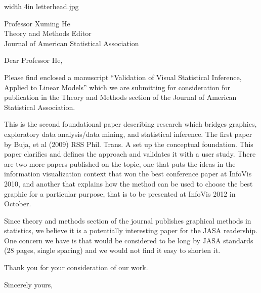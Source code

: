 \documentclass{letter}
\makeatletter
\def\apl#1#2{
\begin{letter}{#1}
\signature{Mahbubul Majumder, Heike Hofmann and Dianne Cook\\Department of Statistics\\Iowa State University 
\\Ames, Iowa 50011-1210\\ Phone (515) 294 3440\\{\tt mahbub@iastate.edu}}
\opening{{Dear #2,}}

Please find enclosed a manuscript  ``Validation of Visual
Statistical Inference, Applied to Linear Models'' which we are
submitting for consideration for publication in the
Theory and Methods section of the Journal of American Statistical
Association.

This is the second foundational paper describing research which bridges
graphics, exploratory data analysis/data mining, and statistical
inference. The first paper by Buja, et al (2009) RSS Phil. Trans. A
set up the conceptual foundation. This paper clarifies and defines the
approach and validates it with a user study. There are two more papers
published on the topic, one that puts the ideas in the information
visualization context that won the best conference paper at InfoVis
2010, and another that explains how the method can be used to choose
the best graphic for a particular purpose, that is to be presented at
InfoVis 2012 in October.

Since theory and methods section of the journal publishes graphical
methods in statistics, we believe it is a potentially interesting
paper for the JASA readership. One concern we have is that would be
considered to be long by JASA standards (28 pages, single spacing) and
we would not find it easy to shorten it.

Thank you for your consideration of our work.

\closing{Sincerely yours,
}
\end{letter}}
\makeatother
\begin{document}
{{\pdfimage width 4in {letterhead.jpg}}}
\apl{Professor Xuming He \\Theory and Methods Editor\\Journal of American Statistical Association}{Professor He}
\end{document}
